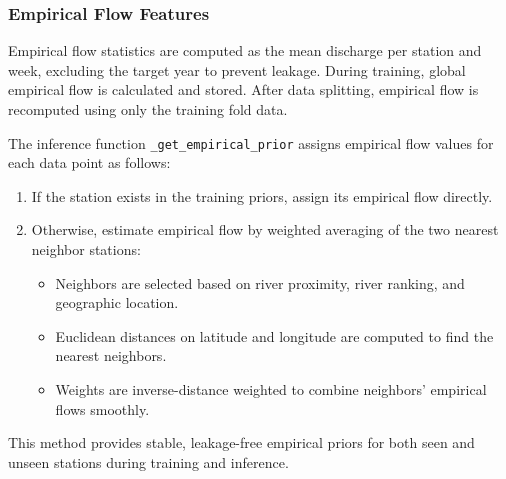\documentclass[ruler]{CUP-JNL-EDS}%
\begin{document}
\subsubsection*{Empirical Flow Features}
Empirical flow statistics are computed as the mean discharge per station and week, excluding the target year to prevent leakage. During training, global empirical flow is calculated and stored. After data splitting, empirical flow is recomputed using only the training fold data.

The inference function \texttt{\_get\_empirical\_prior} assigns empirical flow values for each data point as follows:

\begin{enumerate}
    \item If the station exists in the training priors, assign its empirical flow directly.
    \item Otherwise, estimate empirical flow by weighted averaging of the two nearest neighbor stations:
    \begin{itemize}
        \item Neighbors are selected based on river proximity, river ranking, and geographic location.
        \item Euclidean distances on latitude and longitude are computed to find the nearest neighbors.
        \item Weights are inverse-distance weighted to combine neighbors' empirical flows smoothly.
    \end{itemize}
\end{enumerate}

\noindent This method provides stable, leakage-free empirical priors for both seen and unseen stations during training and inference.

\bigskip
\end{document}

